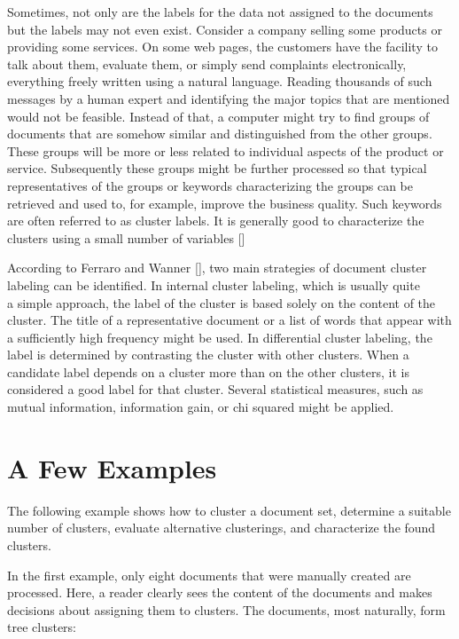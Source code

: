 Sometimes, not only are the labels for the data not assigned to the documents but the labels may not even exist. Consider a company selling some products or providing some services. On some web pages, the customers have the facility to talk about them, evaluate them, or simply send complaints electronically, everything freely written using a natural language. Reading thousands of such messages by a human expert and identifying the major topics that are mentioned would not be feasible. Instead of that, a computer might try to find groups of documents that are somehow similar and distinguished from the other groups. These groups will be more or less related to individual aspects of the product or service. Subsequently these groups might be further processed so that typical representatives of the groups or keywords characterizing the groups can be retrieved and used to, for example, improve the business quality. Such keywords are often referred to as cluster labels. It is generally good to characterize the clusters using a small number of variables [\cite{ref115}]

According to Ferraro and Wanner [\cite{ref88}], two main strategies of document cluster labeling can be identified. In internal cluster labeling, which is usually quite\\
a simple approach, the label of the cluster is based solely on the content of the cluster. The title of a representative document or a list of words that appear with a sufficiently high frequency might be used. In differential cluster labeling, the label is determined by contrasting the cluster with other clusters. When a candidate label depends on a cluster more than on the other clusters, it is considered a good label for that cluster. Several statistical measures, such as mutual information, information gain, or chi squared might be applied.

\section{A Few Examples}
The following example shows how to cluster a document set, determine a suitable number of clusters, evaluate alternative clusterings, and characterize the found clusters.

In the first example, only eight documents that were manually created are processed. Here, a reader clearly sees the content of the documents and makes decisions about assigning them to clusters. The documents, most naturally, form tree clusters:

